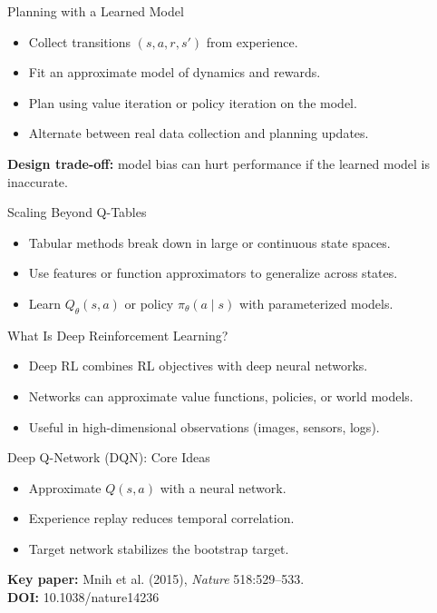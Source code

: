 \documentclass[aspectratio=169]{beamer}
\newcommand{\defaultdeckrefs}{AIMA4e Ch.22 pp.789--822; Poole3e Ch.13 pp.583--608}
\newcommand{\currentsliderefs}{\defaultdeckrefs}
\newcommand{\setslideref}[1]{\gdef\currentsliderefs{#1}}
\begin{document}
\setslideref{AIMA4e Ch.22 pp.789--822; Poole3e Ch.13 pp.583--608}
\begin{frame}{Planning with a Learned Model}
\begin{itemize}
  \item Collect transitions $(s,a,r,s')$ from experience.
  \item Fit an approximate model of dynamics and rewards.
  \item Plan using value iteration or policy iteration on the model.
  \item Alternate between real data collection and planning updates.
\end{itemize}
\vspace{0.4em}
\textbf{Design trade-off:} model bias can hurt performance if the learned model is inaccurate.
\end{frame}

\setslideref{AIMA4e Ch.22 pp.789--822; Poole3e Ch.13 pp.583--608; doi:10.1038/nature14236}
\begin{frame}{Scaling Beyond Q-Tables}
\begin{itemize}
  \item Tabular methods break down in large or continuous state spaces.
  \item Use features or function approximators to generalize across states.
  \item Learn $Q_\theta(s,a)$ or policy $\pi_\theta(a\mid s)$ with parameterized models.
\end{itemize}
\end{frame}

\setslideref{AIMA4e Ch.22 pp.789--822; Poole3e Ch.13 pp.583--608; doi:10.1038/nature14236}
\begin{frame}{What Is Deep Reinforcement Learning?}
\begin{itemize}
  \item Deep RL combines RL objectives with deep neural networks.
  \item Networks can approximate value functions, policies, or world models.
  \item Useful in high-dimensional observations (images, sensors, logs).
\end{itemize}
\end{frame}

\setslideref{AIMA4e Ch.22 pp.789--822; Poole3e Ch.13 pp.583--608; doi:10.1038/nature14236}
\begin{frame}{Deep Q-Network (DQN): Core Ideas}
\begin{itemize}
  \item Approximate $Q(s,a)$ with a neural network.
  \item Experience replay reduces temporal correlation.
  \item Target network stabilizes the bootstrap target.
\end{itemize}
\vspace{0.4em}
\textbf{Key paper:} Mnih et al. (2015), \textit{Nature} 518:529--533.\\
\textbf{DOI:} 10.1038/nature14236
\end{frame}
\end{document}
